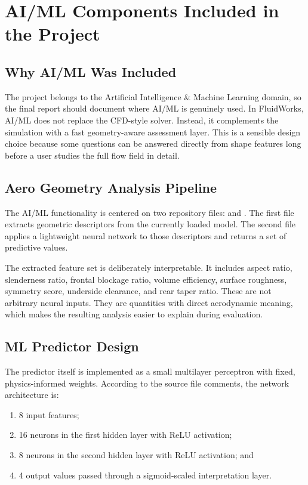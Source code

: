 \documentclass[12pt,a4paper,titlepage]{report}
\begin{document}
\chapter{AI/ML Components Included in the Project}
\section{Why AI/ML Was Included}
The project belongs to the Artificial Intelligence \& Machine Learning domain, so the final report should document where AI/ML is genuinely used. In FluidWorks, AI/ML does not replace the CFD-style solver. Instead, it complements the simulation with a fast geometry-aware assessment layer. This is a sensible design choice because some questions can be answered directly from shape features long before a user studies the full flow field in detail.

\section{Aero Geometry Analysis Pipeline}
The AI/ML functionality is centered on two repository files:  and . The first file extracts geometric descriptors from the currently loaded model. The second file applies a lightweight neural network to those descriptors and returns a set of predictive values.

The extracted feature set is deliberately interpretable. It includes aspect ratio, slenderness ratio, frontal blockage ratio, volume efficiency, surface roughness, symmetry score, underside clearance, and rear taper ratio. These are not arbitrary neural inputs. They are quantities with direct aerodynamic meaning, which makes the resulting analysis easier to explain during evaluation.

\section{ML Predictor Design}
The predictor itself is implemented as a small multilayer perceptron with fixed, physics-informed weights. According to the source file comments, the network architecture is:
\begin{enumerate}
\item 8 input features;
\item 16 neurons in the first hidden layer with ReLU activation;
\item 8 neurons in the second hidden layer with ReLU activation; and
\item 4 output values passed through a sigmoid-scaled interpretation layer.
\end{enumerate}
\end{document}

